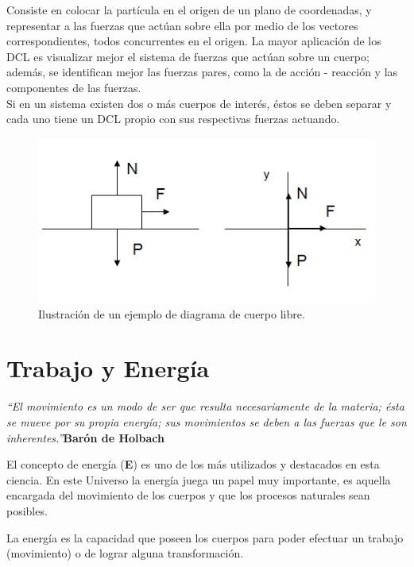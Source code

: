 \documentclass[a5paper,pagesize,10pt,bibtotoc,pointlessnumbers,
normalheadings,DIV=9,fleqn,x11names,table,twoside=false]{scrbook}
\begin{document}
Consiste en colocar la partícula en el origen de un plano de coordenadas, y representar a las fuerzas que actúan sobre ella por 
medio de los vectores correspondientes, todos concurrentes en el origen. La mayor aplicación de los DCL es visualizar mejor el 
sistema de fuerzas que actúan sobre un cuerpo; además, se identifican mejor las fuerzas pares, como la de acción - reacción y las 
componentes de las fuerzas.\\

Si en un sistema existen dos o más cuerpos de interés, éstos se deben separar y cada uno tiene un DCL propio con sus respectivas 
fuerzas actuando.

\begin{figure}[ht]
 \centering
 \includegraphics[scale=0.6]{images/cuerpo-libre.png}
 \caption{Ilustración de un ejemplo de diagrama de cuerpo libre.}\label{frb}
\end{figure}

\chapter{Trabajo y Energía}

\textit{``El movimiento es un modo de ser que resulta necesariamente de la materia; ésta se mueve por su propia energía; sus 
movimientos se deben a las fuerzas que le son inherentes.''}\textbf{Barón de Holbach}\vspace{1.0 cm}

El concepto de energía (\textbf{E}) es uno de los más utilizados y destacados en esta ciencia. En este Universo la energía juega 
un papel muy importante, es aquella encargada del movimiento de los cuerpos y que los procesos naturales sean posibles.

\begin{tcolorbox}
La energía es la capacidad que poseen los cuerpos para poder efectuar un trabajo (movimiento) o de lograr alguna transformación.  
\end{tcolorbox}
\end{document}
